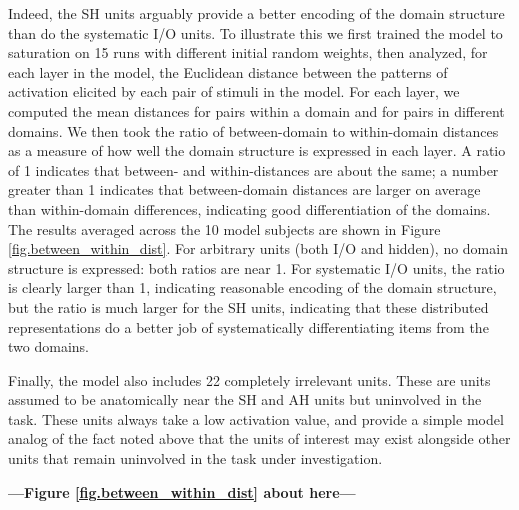 Indeed, the SH units arguably provide a better encoding of the domain structure than do the systematic I/O units. To illustrate this we first trained the model to saturation on 15 runs with different initial random weights, then analyzed, for each layer in the model, the Euclidean distance between the patterns of activation elicited by each pair of stimuli in the model. For each layer, we computed the mean distances for pairs within a domain and for pairs in different domains. We then took the ratio of between-domain to within-domain distances as a measure of how well the domain structure is expressed in each layer. A ratio of 1 indicates that between- and within-distances are about the same; a number greater than 1 indicates that between-domain distances are larger on average than within-domain differences, indicating good differentiation of the domains. The results averaged across the 10 model subjects are shown in Figure \ref{fig.between_within_dist}. For arbitrary units (both I/O and hidden), no domain structure is expressed: both ratios are near 1. For systematic I/O units, the ratio is clearly larger than 1, indicating reasonable encoding of the domain structure, but the ratio is much larger for the SH units, indicating that these distributed representations do a better job of systematically differentiating items from the two domains.


Finally, the model also includes 22 completely irrelevant units. These are units assumed to be anatomically near the SH and AH units but uninvolved in the task. These units always take a low activation value, and provide a simple model analog of the fact noted above that the units of interest may exist alongside other units that remain uninvolved in the task under investigation.

\begin{center}
\textbf{---Figure \ref{fig.between_within_dist} about here---}
\end{center}

